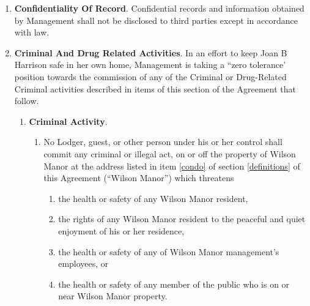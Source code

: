 \documentclass[12pt,letterpaper]{article}
\newcommand{\lodger}{Lodger}
\newcommand{\mom}{Joan B Harrison}
\newcommand{\ownermail}{Owner Email}
\newcommand{\management}{Management}
\newcommand{\condo}{Wilson Manor}
\newcommand{\lemail}{Lodger Email}
\newcommand{\paymenttime}{Payment Notification Time-Date}
\begin{document}
\begin{enumerate}
\begin{enumerate}
\begin{enumerate}
							Venmo will notify \management{} of the payment via the \ownermail{}, and \management{} will consider the payment as having been received at the time and date stamped on the Venmo notification (``\paymenttime{}''). 
						\item For reasons of security and convenience, \management{} shall not accept cash payments. Unless otherwise directed in writing by \management{}, all payments shall be made through Venmo's website https://venmo.com/, one of Venmo's apps for Android/iOS, or by any other method Venmo provides. 
					\end{enumerate}
				\item \textbf{Receipt}. \management{} will provide receipt of payment via one of the \lemail{} that is set forth in item \ref{lemail} of section \ref{definitions} of this Agreement{}, and record payment was received at the \paymenttime{}. 
			\end{enumerate}
		\item \textbf{Confidentiality Of Record}. 
			Confidential records and information obtained by \management{} shall not be disclosed to third parties except in accordance with law. 
		\item \textbf{Criminal And Drug Related Activities}. 
			In an effort to keep \mom{} safe in her own home, \management{} is taking a ``zero tolerance' position towards the commission of any of the Criminal or Drug-Related Criminal activities described in items of this section of the Agreement that follow. 
			\begin{enumerate} 
				\item \textbf{Criminal Activity}. \label{criminal}
					\begin{enumerate}
						\item No \lodger{}, guest, or other person under his or her control shall commit any criminal or illegal act, on or off the property of \condo{} at the address listed in item \ref{condo} of section \ref{definitions} of this Agreement (``\condo{}'') which threatens 
							\begin{enumerate} 
								\item the health or safety of any \condo{} resident, 
								\item the rights of any \condo{} resident to the peaceful and quiet enjoyment of his or her residence, 
								\item the health or safety of any of \condo{} management's employees, or 
								\item the health or safety of any member of the public who is on or near \condo{} property. 

\end{enumerate}
\end{enumerate}
\end{enumerate}
\end{enumerate}
\end{document}
